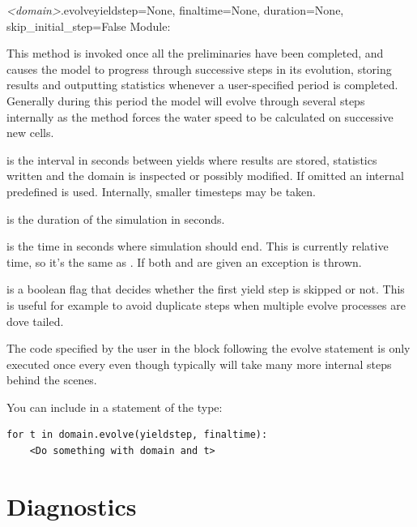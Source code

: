 \documentclass{manual}
\begin{document}
\begin{methoddesc}{\emph{<domain>}.evolve}{yieldstep=None,
                                           finaltime=None,
                                           duration=None,
                                           skip_initial_step=False}
Module: 

This method is invoked once all the
preliminaries have been completed, and causes the model to progress
through successive steps in its evolution, storing results and
outputting statistics whenever a user-specified period
 is completed.  Generally during this period the
model will evolve through several steps internally
as the method forces the water speed to be calculated
on successive new cells. 

 is the interval in seconds between yields where results are
stored, statistics written and the domain is inspected or possibly modified.
If omitted an internal predefined  is used.  Internally, smaller
timesteps may be taken.

 is the duration of the simulation in seconds.

 is the time in seconds where simulation should end. This is currently
relative time, so it's the same as .  If both  and
 are given an exception is thrown.

 is a boolean flag that decides whether the first
yield step is skipped or not. This is useful for example to avoid
duplicate steps when multiple evolve processes are dove tailed.

The code specified by the user in the block following the evolve statement is
only executed once every  even though 
\anuga typically will take many more internal steps behind the scenes.

You can include  in a statement of the type:

\begin{verbatim}
for t in domain.evolve(yieldstep, finaltime):
    <Do something with domain and t>
\end{verbatim}
\end{methoddesc}

\section{Diagnostics}
\label{sec:diagnostics}
\end{document}
